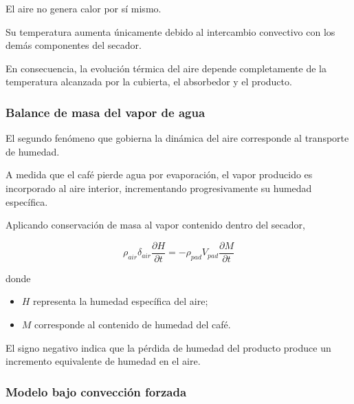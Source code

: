 \begin{tcolorbox}[title=Interpretación física,colback=blue!3,colframe=blue!60!black]

El aire no genera calor por sí mismo.

Su temperatura aumenta únicamente debido al intercambio convectivo con los demás componentes del secador.

En consecuencia, la evolución térmica del aire depende completamente de la temperatura alcanzada por la cubierta, el absorbedor y el producto.

\end{tcolorbox}

\subsubsection{Balance de masa del vapor de agua}

El segundo fenómeno que gobierna la dinámica del aire corresponde al transporte de humedad.

A medida que el café pierde agua por evaporación, el vapor producido es incorporado al aire interior, incrementando progresivamente su humedad específica.

Aplicando conservación de masa al vapor contenido dentro del secador,

\begin{equation}
\boxed{
\rho_{air}\delta_{air}
\frac{\partial H}{\partial t}
=
-
\rho_{pad}
V_{pad}
\frac{\partial M}{\partial t}
}
\end{equation}

donde

\begin{itemize}

\item $H$ representa la humedad específica del aire;

\item $M$ corresponde al contenido de humedad del café.

\end{itemize}

El signo negativo indica que la pérdida de humedad del producto produce un incremento equivalente de humedad en el aire.

\subsubsection{Modelo bajo convección forzada}

